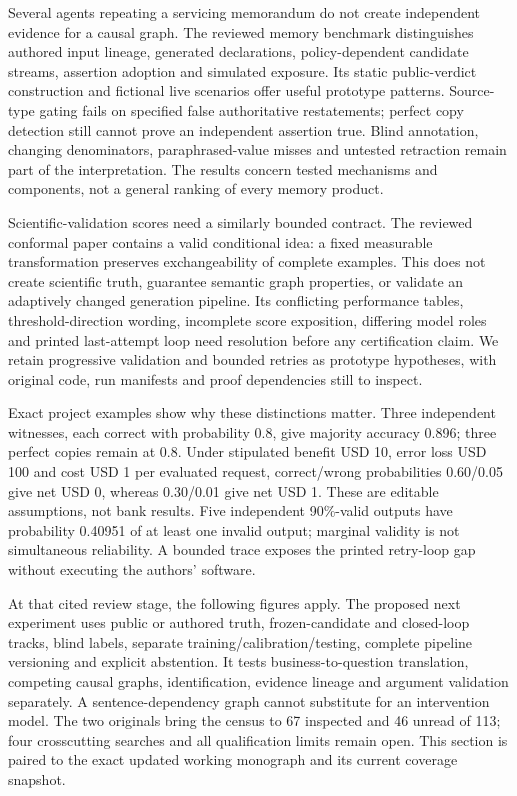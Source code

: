 Several agents repeating a servicing memorandum do not create
independent evidence for a causal graph. The reviewed memory benchmark
distinguishes authored input lineage, generated declarations,
policy-dependent candidate streams, assertion adoption and simulated
exposure. Its static public-verdict construction and fictional live
scenarios offer useful prototype patterns. Source-type gating fails on
specified false authoritative restatements; perfect copy detection still
cannot prove an independent assertion true. Blind annotation, changing
denominators, paraphrased-value misses and untested retraction remain
part of the interpretation. The results concern tested mechanisms and
components, not a general ranking of every memory product.
\citep{exec23_epistemic_admission}

Scientific-validation scores need a similarly bounded contract. The
reviewed conformal paper contains a valid conditional idea: a fixed
measurable transformation preserves exchangeability of complete
examples. This does not create scientific truth, guarantee semantic
graph properties, or validate an adaptively changed generation pipeline.
Its conflicting performance tables, threshold-direction wording,
incomplete score exposition, differing model roles and printed
last-attempt loop need resolution before any certification claim. We
retain progressive validation and bounded retries as prototype
hypotheses, with original code, run manifests and proof dependencies
still to inspect. \citep{exec23_scientific_conformal}

Exact project examples show why these distinctions matter. Three
independent witnesses, each correct with probability 0.8, give majority
accuracy 0.896; three perfect copies remain at 0.8. Under stipulated
benefit USD 10, error loss USD 100 and cost USD 1 per evaluated request,
correct/wrong probabilities 0.60/0.05 give net USD 0, whereas 0.30/0.01
give net USD 1. These are editable assumptions, not bank results. Five
independent 90\%-valid outputs have probability 0.40951 of at least one
invalid output; marginal validity is not simultaneous reliability. A
bounded trace exposes the printed retry-loop gap without executing the
authors' software. \citep{exec23_admission_conformal_reference}

At that cited review stage, the following figures apply. The proposed
next experiment uses public or authored truth, frozen-candidate and
closed-loop tracks, blind labels, separate training/calibration/testing,
complete pipeline versioning and explicit abstention. It tests
business-to-question translation, competing causal graphs,
identification, evidence lineage and argument validation separately. A
sentence-dependency graph cannot substitute for an intervention model.
The two originals bring the census to 67 inspected and 46 unread of 113;
four crosscutting searches and all qualification limits remain open.
This section is paired to the exact updated working monograph and its
current coverage snapshot.
\citep{sp23admission_reader,sp23admission_progress}

